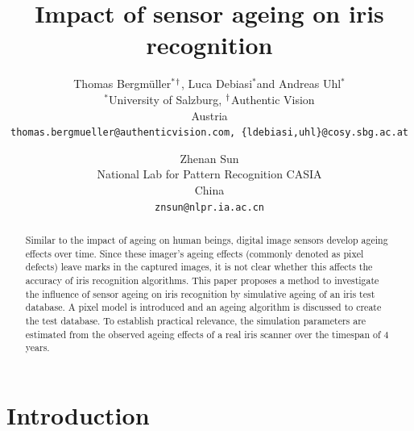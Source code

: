 \documentclass[10pt,twocolumn,letterpaper]{article}
\newcommand{\superscript}[1]{\ensuremath{^{\textrm{#1}}}}
\def\wu{\superscript{*}}
\def\wg{\superscript{\dag}}
\begin{document}
\title{Impact of sensor ageing on iris recognition}

\author{Thomas Bergm{\"u}ller\wu\wg, Luca Debiasi\wu and Andreas Uhl\wu\\
\wu University of Salzburg, \wg Authentic Vision\\
Austria\\
{\tt\small thomas.bergmueller@authenticvision.com, \tt\small \{ldebiasi,uhl\}@cosy.sbg.ac.at}
\and
Zhenan Sun\\
National Lab for Pattern Recognition CASIA\\
China\\
{\tt\small znsun@nlpr.ia.ac.cn}
}


\maketitle
\thispagestyle{empty}

\begin{abstract}
   Similar to the impact of ageing on human beings, digital image sensors develop ageing effects over time. Since these imager's ageing effects (commonly denoted as pixel defects) leave marks in the captured images, it is not clear whether this affects the accuracy of iris recognition algorithms. This paper proposes a method to investigate the influence of sensor ageing on iris recognition by simulative ageing of an iris test database. A pixel model is introduced and an ageing algorithm is discussed to create the test database. To establish practical relevance, the simulation parameters are estimated from the observed ageing effects of a real iris scanner over the timespan of 4 years.
\end{abstract}




\section{Introduction}
\end{document}
